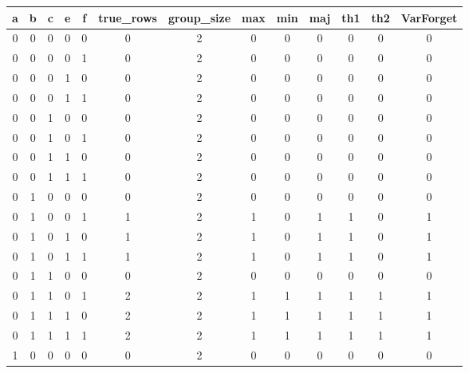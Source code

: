 \begin{table}[!tb]
    \centering
    \begin{tabular}{|c|c|c|c|c|c|c|c|c|c|c|c|c|}
        \hline
        \textbf{a} & \textbf{b} & \textbf{c} & \textbf{e} & \textbf{f} & \textbf{true\_rows} & \textbf{group\_size} & \textbf{max} & \textbf{min} & \textbf{maj} & \textbf{th1} & \textbf{th2} & \textbf{VarForget} \\ \hline
        \rowcolor{gray!40} 0 & 0 & 0 & 0 & 0 & 0 & 2 & 0 & 0 & 0 & 0 & 0 & 0 \\ \hline
        \rowcolor{blue!40} 0 & 0 & 0 & 0 & 1 & 0 & 2 & 0 & 0 & 0 & 0 & 0 & 0 \\ \hline
        \rowcolor{red!40} 0 & 0 & 0 & 1 & 0 & 0 & 2 & 0 & 0 & 0 & 0 & 0 & 0 \\ \hline
        \rowcolor{green!40} 0 & 0 & 0 & 1 & 1 & 0 & 2 & 0 & 0 & 0 & 0 & 0 & 0 \\ \hline
        \rowcolor{yellow!40} 0 & 0 & 1 & 0 & 0 & 0 & 2 & 0 & 0 & 0 & 0 & 0 & 0 \\ \hline
        \rowcolor{gray!40} 0 & 0 & 1 & 0 & 1 & 0 & 2 & 0 & 0 & 0 & 0 & 0 & 0 \\ \hline
        \rowcolor{blue!40} 0 & 0 & 1 & 1 & 0 & 0 & 2 & 0 & 0 & 0 & 0 & 0 & 0 \\ \hline
        \rowcolor{red!40} 0 & 0 & 1 & 1 & 1 & 0 & 2 & 0 & 0 & 0 & 0 & 0 & 0 \\ \hline
        \rowcolor{green!40} 0 & 1 & 0 & 0 & 0 & 0 & 2 & 0 & 0 & 0 & 0 & 0 & 0 \\ \hline
        \rowcolor{yellow!40} 0 & 1 & 0 & 0 & 1 & 1 & 2 & 1 & 0 & 1 & 1 & 0 & 1 \\ \hline
        \rowcolor{gray!40} 0 & 1 & 0 & 1 & 0 & 1 & 2 & 1 & 0 & 1 & 1 & 0 & 1 \\ \hline
        \rowcolor{blue!40} 0 & 1 & 0 & 1 & 1 & 1 & 2 & 1 & 0 & 1 & 1 & 0 & 1 \\ \hline
        \rowcolor{red!40} 0 & 1 & 1 & 0 & 0 & 0 & 2 & 0 & 0 & 0 & 0 & 0 & 0 \\ \hline
        \rowcolor{green!40} 0 & 1 & 1 & 0 & 1 & 2 & 2 & 1 & 1 & 1 & 1 & 1 & 1 \\ \hline
        \rowcolor{yellow!40} 0 & 1 & 1 & 1 & 0 & 2 & 2 & 1 & 1 & 1 & 1 & 1 & 1 \\ \hline
        \rowcolor{gray!40} 0 & 1 & 1 & 1 & 1 & 2 & 2 & 1 & 1 & 1 & 1 & 1 & 1 \\ \hline
        \rowcolor{blue!40} 1 & 0 & 0 & 0 & 0 & 0 & 2 & 0 & 0 & 0 & 0 & 0 & 0 \\ \hline

\end{tabular}
\end{table}
